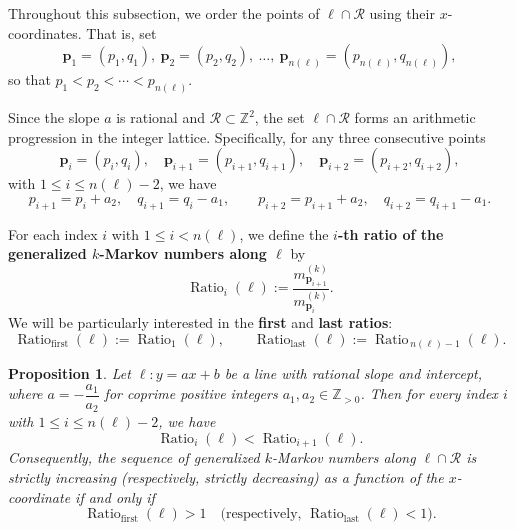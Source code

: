 \documentclass{article}
\newtheorem{prop}[theorem]{Proposition}
\theoremstyle{remark}
\begin{document}
Throughout this subsection, we order the points of $\ell \cap \mathcal{R}$ using their $x$-coordinates. That is, set
\[
\mathbf{p}_1 = (p_1, q_1),\ 
\mathbf{p}_2 = (p_2, q_2),\ 
\dots,\ 
\mathbf{p}_{n(\ell)} = (p_{n(\ell)}, q_{n(\ell)}),
\]
so that $p_1 < p_2 < \cdots < p_{n(\ell)}$.

Since the slope $a$ is rational and $\mathcal{R} \subset \mathbb{Z}^2$, the set $\ell \cap \mathcal{R}$ forms an arithmetic progression in the integer lattice. Specifically, for any three consecutive points  
\[
\mathbf{p}_i = (p_i, q_i),\quad 
\mathbf{p}_{i+1} = (p_{i+1}, q_{i+1}),\quad 
\mathbf{p}_{i+2} = (p_{i+2}, q_{i+2}) ,
\]
with $1 \leq i \leq n(\ell) - 2$, we have 
\[
p_{i+1} = p_i + a_2,\quad q_{i+1} = q_i - a_1,
\qquad
p_{i+2} = p_{i+1} + a_2,\quad q_{i+2} = q_{i+1} - a_1.
\]

For each index $i$ with $1 \leq i < n(\ell)$, we define the \textbf{$i$-th ratio of the generalized $k$-Markov numbers along $\ell$} by
\[
\operatorname{Ratio}_i(\ell) := \frac{m^{(k)}_{\mathbf{p}_{i+1}}}{m^{(k)}_{\mathbf{p}_i}}.
\]
We will be particularly interested in the \textbf{first} and \textbf{last ratios}:
\begin{equation}\label{eq:extremal_ratios}
\operatorname{Ratio}_{\mathrm{first}}(\ell) := \operatorname{Ratio}_{1}(\ell),
\qquad
\operatorname{Ratio}_{\mathrm{last}}(\ell) := \operatorname{Ratio}_{\,n(\ell)-1}(\ell).
\end{equation}

\begin{prop}\label{prop:negative_slope}
Let $\ell: y = ax + b$ be a line with rational slope and intercept, where $a = -\dfrac{a_1}{a_2}$ for coprime positive integers $a_1, a_2 \in \mathbb{Z}_{>0}$.  
Then for every index $i$ with $1 \leq i \leq n(\ell) - 2$, we have
\[
\operatorname{Ratio}_i(\ell) < \operatorname{Ratio}_{i+1}(\ell).
\]
Consequently, the sequence of generalized $k$-Markov numbers along $\ell \cap \mathcal{R}$ is strictly increasing (respectively, strictly decreasing) as a function of the $x$-coordinate if and only if 
\[
\operatorname{Ratio}_{\mathrm{first}}(\ell) > 1 \quad \text{(respectively, } \operatorname{Ratio}_{\mathrm{last}}(\ell) < 1\text{)}.
\]
\end{prop}
\end{document}
